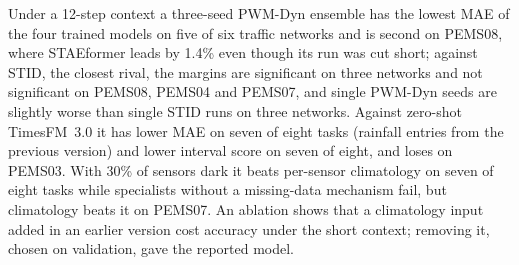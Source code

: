 Under a 12-step context a three-seed PWM-Dyn ensemble has the lowest MAE of the four trained models on five of six traffic networks and is
second on PEMS08, where STAEformer leads by 1.4\% even though its run was cut short; against STID, the
closest rival, the margins are significant on three networks and not significant on PEMS08, PEMS04
and PEMS07,
and single PWM-Dyn seeds are slightly worse than single STID runs on three networks. Against zero-shot
TimesFM~3.0 it has lower MAE on seven of eight tasks (rainfall entries from the previous version) and lower interval score on seven of eight, and loses on PEMS03.
With 30\% of sensors dark it beats per-sensor climatology on seven of eight tasks while specialists without a
missing-data mechanism fail, but climatology beats it on PEMS07. An ablation shows that a climatology input added in an earlier
version cost accuracy under the short context; removing it, chosen on validation, gave the reported model.
